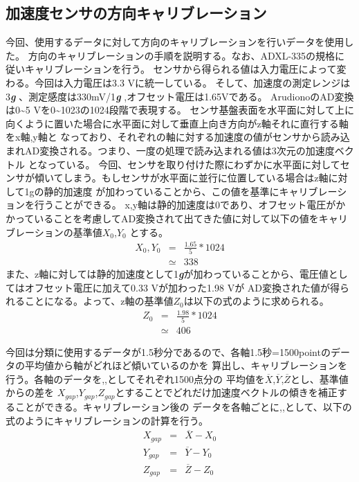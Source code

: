 \subsection{加速度センサの方向キャリブレーション}
		今回、使用するデータに対して方向のキャリブレーションを行いデータを使用した。
		方向のキャリブレーションの手順を説明する。なお、ADXL-335の規格に従いキャリブレーションを行う。
		センサから得られる値は入力電圧によって変わる。今回は入力電圧は3.3 Vに統一している。
		そして、加速度の測定レンジは{\pm}3\textit{\textbf{g}} 、測定感度は330mV/1\textit{\textbf{g}} ,オフセット電圧は1.65Vである。
		ArudionoのAD変換は0{\sim}5 Vを0{\sim}1023の1024段階で表現する。
		センサ基盤表面を水平面に対して上に向くように置いた場合に水平面に対して垂直上向き方向がz軸それに直行する軸をx軸,y軸と
		なっており、それぞれの軸に対する加速度の値がセンサから読み込まれAD変換される。つまり、一度の処理で読み込まれる値は3次元の加速度ベクトル
		となっている。
		今回、センサを取り付けた際にわずかに水平面に対してセンサが傾いてしまう。もしセンサが水平面に並行に位置している場合はz軸に対して1gの静的加速度
		が加わっていることから、この値を基準にキャリブレーションを行うことができる。
		x,y軸は静的加速度は0であり、オフセット電圧がかかっていることを考慮してAD変換されて出てきた値に対して以下の値をキャリブレーションの基準値$X_{0}$,$Y_{0}$
		とする。
		\begin{eqnarray*}
		 		X_{0},Y_{0}&= &\frac{1.65}{5}*1024\\
		 				   &\simeq &338
		\end{eqnarray*}
		また、z軸に対しては静的加速度として1\textit{\textbf{g}}が加わっていることから、電圧値としてはオフセット電圧に加えて0.33 Vが加わった1.98 Vが
		AD変換された値が得られることになる。よって、z軸の基準値$Z_{0}$は以下の式のように求められる。
		\begin{eqnarray*}
			
		 		Z_{0}&= & \frac{1.98}{5}*1024\\
		 				   &\simeq &406
			
		\end{eqnarray*}

		今回は分類に使用するデータが1.5秒分であるので、各軸1.5秒=1500pointのデータの平均値から軸がどれほど傾いているのかを
		算出し、キャリブレーションを行う。各軸のデータを,,としてそれぞれ1500点分の
		平均値を$\overline{X}$,$\overline{Y}$,$\overline{Z}$とし、基準値からの差を
		$X_{gap}$,$Y_{gap}$,$Z_{gap}$とすることでどれだけ加速度ベクトルの傾きを補正することができる。キャリブレーション後の
		データを各軸ごとに,,として、以下の式のようにキャリブレーションの計算を行う。
		\begin{eqnarray*}
			X_{gap}&=&\overline{X} - X_{0}\\
			Y_{gap}&=&\overline{Y} - Y_{0}\\
			Z_{gap}&=&\overline{Z} - Z_{0}
		\end{eqnarray*}

